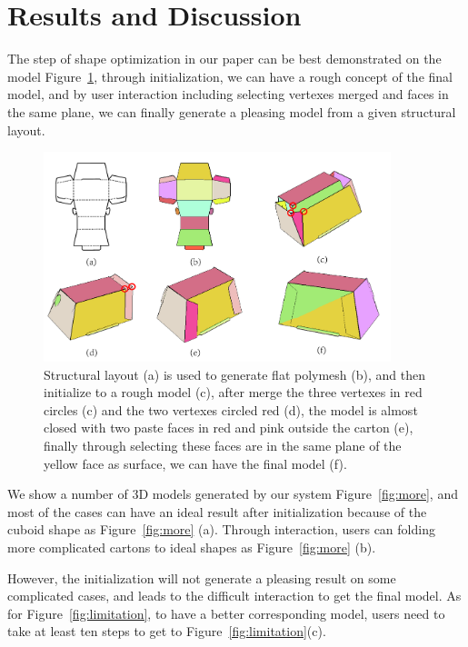 \section{Results and Discussion}\label{sec:result}
{\color{red}{SS: Any need to list the number of steps we take to generate final model?}}

The step of shape optimization in our paper can be best demonstrated on the model Figure~\ref{fig:result}, through initialization, we can have a rough concept of the final model, and by user interaction including selecting vertexes merged and faces in the same plane, we can finally generate a pleasing model from a given structural layout.

\begin{figure}
	\centering
	\includegraphics[width=0.9\textwidth]{images/result.jpg}
	\caption{Structural layout (a) is used to generate flat polymesh (b), and then initialize to a rough model (c), after merge the three vertexes in red circles (c) and the two vertexes circled red (d), the model is almost closed with two paste faces in red and pink outside the carton (e), finally through selecting these faces are in the same plane of the yellow face as surface, we can have the final model (f).}
	\label{fig:result}
\end{figure}

We show a number of 3D models generated by our system Figure~\ref{fig:more}, and most of the cases can have an ideal result after initialization because of the cuboid shape as Figure~\ref{fig:more} (a). Through interaction, users can folding more complicated cartons to ideal shapes as Figure~\ref{fig:more} (b).

{\color{blue}{Add table for number of operation steps}}

However, the initialization will not generate a pleasing result on some complicated cases, and leads to the difficult interaction to get the final model. As for Figure~\ref{fig:limitation}, to have a better corresponding model, users need to take at least ten steps to get to Figure~\ref{fig:limitation}(c). 

